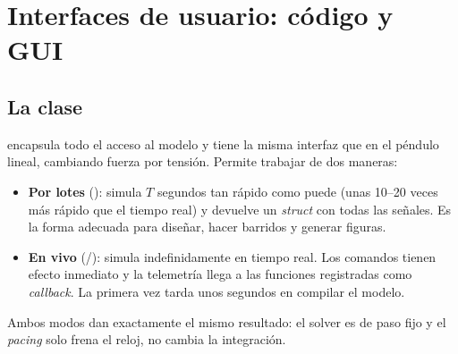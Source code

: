 \chapter{Interfaces de usuario: código y GUI}
\label{cap:codigo}

\section{La clase }

 encapsula todo el acceso al modelo y tiene la misma interfaz que  en el péndulo lineal, cambiando fuerza por tensión. Permite trabajar de dos maneras:
\begin{itemize}
  \item \textbf{Por lotes} (): simula $T$ segundos tan rápido como puede (unas 10--20 veces más rápido que el tiempo real) y devuelve un \emph{struct} con todas las señales. Es la forma adecuada para diseñar, hacer barridos y generar figuras.
  \item \textbf{En vivo} (/): simula indefinidamente en tiempo real. Los comandos tienen efecto inmediato y la telemetría llega a las funciones registradas como \emph{callback}. La primera vez tarda unos segundos en compilar el modelo.
\end{itemize}
Ambos modos dan exactamente el mismo resultado: el solver es de paso fijo y el \emph{pacing} solo frena el reloj, no cambia la integración.

